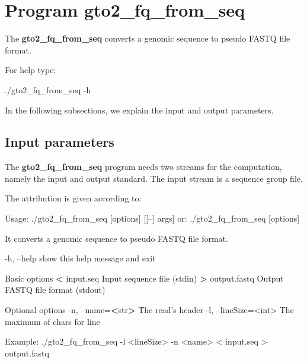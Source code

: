 \documentclass[11pt,]{krantz}
\newenvironment{Shaded}{\begin{snugshade}}{\end{snugshade}}
\newcommand{\StringTok}[1]{\textcolor[rgb]{0.5,0.5,0.5}{#1}}
\newcommand{\OperatorTok}[1]{\textcolor[rgb]{0.43,0.43,0.43}{\textbf{#1}}}
\newcommand{\ExtensionTok}[1]{#1}
\newcommand{\NormalTok}[1]{#1}
\begin{document}
\section{Program gto2\_fq\_from\_seq}\label{program-gto2_fq_from_seq}

The \textbf{gto2\_fq\_from\_seq} converts a genomic sequence to pseudo
FASTQ file format.

For help type:

\begin{Shaded}
\begin{Highlighting}[]
\ExtensionTok{./gto2_fq_from_seq}\NormalTok{ -h}
\end{Highlighting}
\end{Shaded}

In the following subsections, we explain the input and output
parameters.

\subsection*{Input parameters}\label{input-parameters-9}


The \textbf{gto2\_fq\_from\_seq} program needs two streams for the
computation, namely the input and output standard. The input stream is a
sequence group file.

The attribution is given according to:

\begin{Shaded}
\begin{Highlighting}[]
\ExtensionTok{Usage}\NormalTok{: ./gto2_fq_from_seq [options] [[--] args]}
   \ExtensionTok{or}\NormalTok{: ./gto2_fq_from_seq [options]}

\ExtensionTok{It}\NormalTok{ converts a genomic sequence to pseudo FASTQ file format.}

    \ExtensionTok{-h}\NormalTok{, --help            show this help message and exit}

\ExtensionTok{Basic}\NormalTok{ options}
    \OperatorTok{<} \ExtensionTok{input.seq}\NormalTok{           Input sequence file (stdin)}
    \OperatorTok{>} \ExtensionTok{output.fastq}\NormalTok{        Output FASTQ file format (stdout)}

\ExtensionTok{Optional}\NormalTok{ options}
    \ExtensionTok{-n}\NormalTok{, --name=}\OperatorTok{<}\NormalTok{str}\OperatorTok{>}\NormalTok{      The read}\StringTok{'s header}
\StringTok{    -l, --lineSize=<int>  The maximum of chars for line}

\StringTok{Example: ./gto2_fq_from_seq -l <lineSize> -n <name> }
\StringTok{< input.seq > output.fastq}
\end{Highlighting}
\end{Shaded}
\end{document}
